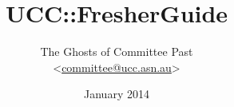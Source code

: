 \begin{titlepage}
\title{UCC::FresherGuide}
\author{The Ghosts of Committee Past \\ <\href{mailto:committee@ucc.asn.au}{committee@ucc.asn.au}>}

\date{January 2014}

\maketitle
\centering

\end{titlepage}
